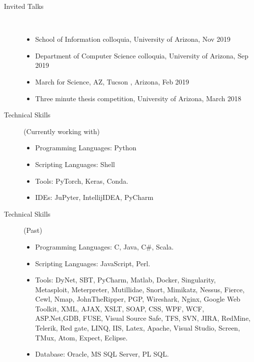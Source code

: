 \documentclass[10pt]{article}
\begin{document}
\begin{description}
\begin{itemize}
\end{itemize}







\item [Invited Talks ]\

\begin{itemize}

\item School of Information colloquia, University of Arizona, Nov 2019
\item Department of Computer Science colloquia, University of Arizona, Sep 2019
\item March for Science, AZ, Tucson , Arizona, Feb 2019
\item Three minute thesis competition, University of Arizona, March 2018

\end{itemize}

\item [Technical Skills](Currently working with) \
\begin{itemize}
\itemsep0em 
\item Programming Languages:  Python
\item Scripting Languages: Shell
\item Tools:  PyTorch, Keras, Conda.
\item IDEs: JuPyter,  IntellijIDEA, PyCharm 
\end{itemize}


\item [Technical Skills] (Past) \
\begin{itemize}
\itemsep0em 
\item Programming Languages:  C, Java, C\#, Scala. 
\item Scripting Languages: JavaScript, Perl.
\item Tools: DyNet, SBT, PyCharm, Matlab, Docker, Singularity, Metasploit, Meterpreter, Mutillidae, Snort, Mimikatz, Nessus, Fierce, Cewl, Nmap, JohnTheRipper, PGP, Wireshark, Nginx, Google Web Toolkit, XML, AJAX, XSLT, SOAP, CSS, WPF, WCF, ASP.Net,GDB, FUSE, Visual Source Safe, TFS, SVN, JIRA, RedMine, Telerik, Red gate, LINQ, IIS, Latex, Apache, Visual Studio, Screen, TMux, Atom, Expect, Eclipse.
\item Database: Oracle, MS SQL Server, PL SQL.\\
\end{itemize}



\end{description}
\end{document}
